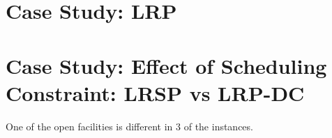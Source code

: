 \documentclass[11pt]{report}
\newcommand{\zaupdate}[1]{\noindent \textcolor{blue}{\bf ZE: #1 } }
\begin{document}





%

\chapter{Case Study: LRP}
%

\chapter{Case Study: Effect of Scheduling Constraint: LRSP vs LRP-DC}
  One of the open facilities is different in 3 of the instances.



%


\pagebreak
\appendix





\pagebreak




%
%

\end{document}
